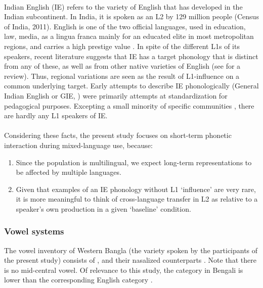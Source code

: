 \documentclass[11pt]{article}
\newcommand{\nt}[1]{\textipa{[#1]}} %
\begin{document}
\paragraph{}Indian English (IE) refers to the variety of English that has developed in the Indian subcontinent. In India, it is spoken as an L2 by 129 million people (Census of India, 2011).  English is one of the two official languages, used in education, law, media, as a lingua franca mainly for an educated elite in most metropolitan regions, and carries a high prestige value \cite{tollefson2014language}.
In spite of the different L1s of its speakers, recent literature suggests that IE has a target phonology that is distinct from any of these, as well as from other native varieties of English (see  for a review). Thus, regional variations are seen as the result of L1-influence on a common underlying target. Early attempts to describe IE phonologically (General Indian English or GIE, \cite{masica1972sound}) were primarily attempts at standardization for pedagogical purposes. Excepting a small minority of specific communities \cite{pandey201517}, there are hardly any L1 speakers of IE.\\

\paragraph{}Considering these facts, the present study focuses on short-term phonetic interaction during mixed-language use, because:
\begin{enumerate}[label=(\roman*)]
	\item Since the population is multilingual, we expect long-term representations to be affected by multiple languages. 
	\item Given that examples of an IE phonology without L1 `influence' are very rare, it is more meaningful to think of cross-language transfer in L2 as relative to a speaker's own production in a given `baseline' condition.
\end{enumerate}


\subsubsection{Vowel systems} \label{vowel systems}
The vowel inventory of Western Bangla (the variety spoken by the participants of the present study) consists of \nt{i, e, \ae, a, O, o, u}, and their nasalized counterparts \cite{garry2001facts}. Note that there is no mid-central vowel. Of relevance to this study, the category \nt{\ae} in Bengali is lower than the corresponding English category \cite{chatterji1921bengali}.\\
\end{document}
